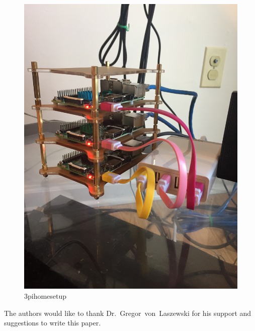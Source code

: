 \begin{figure}[!ht]
  \centering\includegraphics[width=\columnwidth]{images/hid-sp18-413-my3pi.png}
  \caption{3pihomesetup}
\end{figure}


\begin{acks}

  The authors would like to thank Dr.~Gregor~von~Laszewski for his
  support and suggestions to write this paper.

\end{acks}


 

